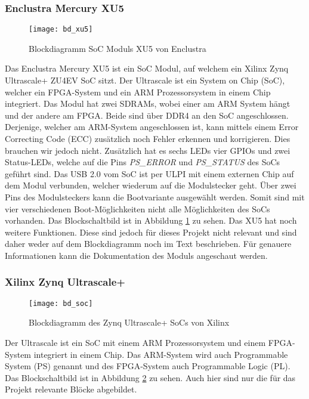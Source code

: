 \subsubsection*{Enclustra Mercury XU5}
\begin{figure}[tb]
    \centering
    \texttt{[image: bd\_xu5]}
    \caption{Blockdiagramm SoC Moduls XU5 von Enclustra}
    \label{fig:bd_xu5}
\end{figure}
Das Enclustra Mercury XU5 ist ein SoC Modul, auf welchem ein Xilinx Zynq Ultrascale+ ZU4EV SoC sitzt. 
Der Ultrascale ist ein System on Chip (SoC), welcher ein FPGA-System und ein ARM Prozessorsystem in einem Chip integriert. 
Das Modul hat zwei SDRAMs, wobei einer am ARM System hängt und der andere am FPGA. Beide sind über DDR4 an den SoC angeschlossen. Derjenige, welcher am ARM-System angeschlossen ist, kann mittels einem Error Correcting Code (ECC) zusätzlich noch Fehler erkennen und korrigieren. Dies brauchen wir jedoch nicht. 
Zusätzlich hat es sechs LEDs vier GPIOs und zwei Status-LEDs, welche auf die Pins \textit{PS\_ERROR} und \textit{PS\_STATUS} des SoCs geführt sind. 
Das USB 2.0 vom SoC ist per ULPI mit einem externen Chip auf dem Modul verbunden, welcher wiederum auf die Modulstecker geht. Über zwei Pins des Modulsteckers kann die Bootvariante ausgewählt werden. Somit sind mit vier verschiedenen Boot-Möglichkeiten nicht alle Möglichkeiten des SoCs vorhanden.
Das Blockschaltbild ist in Abbildung \ref{fig:bd_xu5} zu sehen. Das XU5 hat noch weitere Funktionen. 
Diese sind jedoch für dieses Projekt nicht relevant und sind daher weder auf dem Blockdiagramm noch im Text beschrieben. 
Für genauere Informationen kann die Dokumentation des Moduls angeschaut werden. \cite{xu5}

\subsubsection*{Xilinx Zynq Ultrascale+}
\begin{figure}[tb]
    \centering
    \texttt{[image: bd\_soc]}
    \caption{Blockdiagramm des Zynq Ultrascale+ SoCs von Xilinx}
    \label{fig:bd_soc}
\end{figure}

Der Ultrascale ist ein SoC mit einem ARM Prozessorsystem und einem FPGA-System integriert in einem Chip. Das ARM-System wird auch Programmable System (PS) genannt und des FPGA-System auch Programmable Logic (PL). Das Blockschaltbild ist in Abbildung \ref{fig:bd_soc} zu sehen. Auch hier sind nur die für das Projekt relevante Blöcke abgebildet. 

